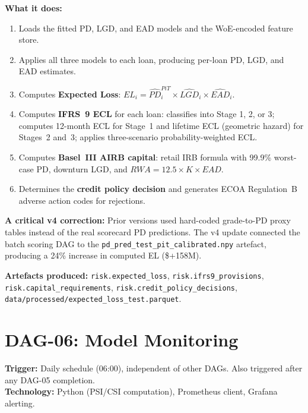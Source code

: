 \documentclass[12pt,a4paper]{report}
\begin{document}
\textbf{What it does:}
\begin{enumerate}
  \item Loads the fitted PD, LGD, and EAD models and the WoE-encoded feature store.
  \item Applies all three models to each loan, producing per-loan PD, LGD, and EAD estimates.
  \item Computes \textbf{Expected Loss}: $EL_i = \hat{PD}_i^{PiT} \times \hat{LGD}_i \times \hat{EAD}_i$.
  \item Computes \textbf{IFRS~9 ECL} for each loan: classifies into Stage 1, 2, or 3; computes 12-month ECL for Stage~1 and lifetime ECL (geometric hazard) for Stages~2 and~3; applies three-scenario probability-weighted ECL.
  \item Computes \textbf{Basel~III AIRB capital}: retail IRB formula with 99.9\% worst-case PD, downturn LGD, and $RWA = 12.5 \times K \times EAD$.
  \item Determines the \textbf{credit policy decision} and generates ECOA Regulation~B adverse action codes for rejections.
\end{enumerate}

\textbf{A critical v4 correction:} Prior versions used hard-coded grade-to-PD proxy tables instead of the real scorecard PD predictions. The v4 update connected the batch scoring DAG to the \texttt{pd\_pred\_test\_pit\_calibrated.npy} artefact, producing a 24\% increase in computed EL (\$+158M).

\textbf{Artefacts produced:} \texttt{risk.expected\_loss}, \texttt{risk.ifrs9\_provisions}, \texttt{risk.capital\_requirements}, \texttt{risk.credit\_policy\_decisions}, \texttt{data/processed/expected\_loss\_test.parquet}.

\section{DAG-06: Model Monitoring}

\textbf{Trigger:} Daily schedule (06:00), independent of other DAGs. Also triggered after any DAG-05 completion.\\
\textbf{Technology:} Python (PSI/CSI computation), Prometheus client, Grafana alerting.
\end{document}
